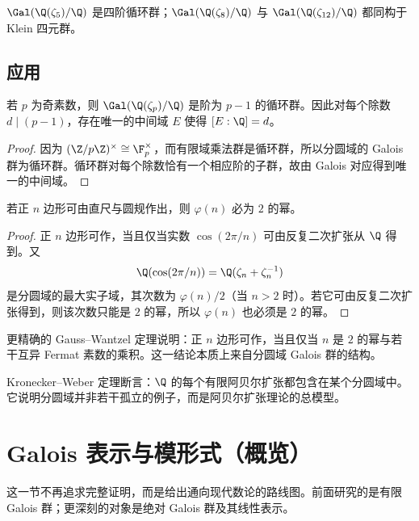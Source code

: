 \begin{example}
$\Gal(\Q(\zeta_5)/\Q)$ 是四阶循环群；$\Gal(\Q(\zeta_8)/\Q)$ 与 $\Gal(\Q(\zeta_{12})/\Q)$ 都同构于 Klein 四元群。
\end{example}

\subsection*{应用}

\begin{proposition}
若 $p$ 为奇素数，则 $\Gal(\Q(\zeta_p)/\Q)$ 是阶为 $p-1$ 的循环群。因此对每个除数 $d\mid(p-1)$，存在唯一的中间域 $E$ 使得 $[E:\Q]=d$。
\end{proposition}

\begin{proof}
因为 $(\Z/p\Z)^\times\cong\F_p^\times$，而有限域乘法群是循环群，所以分圆域的 Galois 群为循环群。循环群对每个除数恰有一个相应阶的子群，故由 Galois 对应得到唯一的中间域。
\end{proof}

\begin{proposition}[正多边形可作的必要条件]
若正 $n$ 边形可由直尺与圆规作出，则 $\varphi(n)$ 必为 $2$ 的幂。
\end{proposition}

\begin{proof}
正 $n$ 边形可作，当且仅当实数 $\cos(2\pi/n)$ 可由反复二次扩张从 $\Q$ 得到。又
\[
\Q(\cos(2\pi/n))=\Q(\zeta_n+\zeta_n^{-1})
\]
是分圆域的最大实子域，其次数为 $\varphi(n)/2$（当 $n>2$ 时）。若它可由反复二次扩张得到，则该次数只能是 $2$ 的幂，所以 $\varphi(n)$ 也必须是 $2$ 的幂。
\end{proof}

\begin{remark}
更精确的 Gauss--Wantzel 定理说明：正 $n$ 边形可作，当且仅当 $n$ 是 $2$ 的幂与若干互异 Fermat 素数的乘积。这一结论本质上来自分圆域 Galois 群的结构。
\end{remark}

\begin{remark}
Kronecker--Weber 定理断言：$\Q$ 的每个有限阿贝尔扩张都包含在某个分圆域中。它说明分圆域并非若干孤立的例子，而是阿贝尔扩张理论的总模型。
\end{remark}

\section{Galois 表示与模形式（概览）}

这一节不再追求完整证明，而是给出通向现代数论的路线图。前面研究的是有限 Galois 群；更深刻的对象是绝对 Galois 群及其线性表示。

